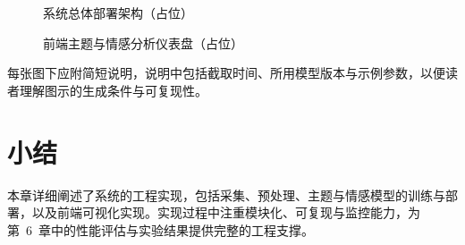 \begin{figure}[ht]
\centering
{}
\caption{系统总体部署架构（占位）}
\label{fig:deploy_arch}
\end{figure}

\begin{figure}[ht]
\centering
{}
\caption{前端主题与情感分析仪表盘（占位）}
\label{fig:dashboard}
\end{figure}

每张图下应附简短说明，说明中包括截取时间、所用模型版本与示例参数，以便读者理解图示的生成条件与可复现性。

\section{小结}
本章详细阐述了系统的工程实现，包括采集、预处理、主题与情感模型的训练与部署，以及前端可视化实现。实现过程中注重模块化、可复现与监控能力，为第~6~章中的性能评估与实验结果提供完整的工程支撑。

